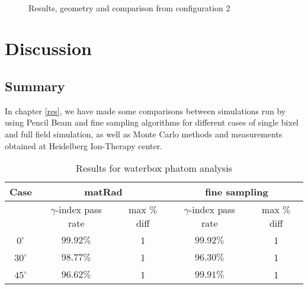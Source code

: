 \documentclass[12pt, a4paper, twoside]{book}
\begin{document}
\newpage
\begin{figure}[h!]
\centering
{} \quad
{} \\
 \quad
\caption{Results, geometry and comparison from configuration 2}
\label{fig:pos2}
\end{figure}


\chapter{Discussion} %

\section{Summary}
In chapter \ref{res}, we have made some comparisons between simulations run by using Pencil Beam and fine sampling algorithms for different cases of single bixel and full field simulation, as well as Monte Carlo methods and measurements obtained at Heidelberg Ion-Therapy center.
\begin{table}[b]
\centering
\begin{tabular}{ccccc}
\toprule
Case & \multicolumn{2}{c}{matRad} & \multicolumn{2}{c}{fine sampling}\\
\midrule
 & $\gamma$-index pass rate & max $\%$ diff & $\gamma$-index pass rate & max $\%$ diff\\
\midrule
$0^\circ$ & $99.92\%$ & 1 & $99.92\%$ &1\\
$30^\circ$ & $98.77\%$ & 1 & $96.30\%$ &1\\
$45^\circ$ & $96.62\%$ & 1 & $99.91\%$ &1\\
\bottomrule
\end{tabular}
\label{tab:hom}
\caption{Results for waterbox phatom analysis}
\end{table}
\end{document}
